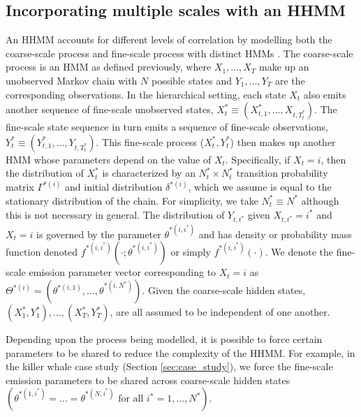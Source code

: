 \subsection{Incorporating multiple scales with an HHMM}

An HHMM accounts for different levels of correlation by modelling both the coarse-scale process and fine-scale process with distinct HMMs \citep{Barajas:2017,Adam:2019}. The coarse-scale process is an HMM as defined previously, where $X_1, \ldots, X_T$ make up an unobserved Markov chain with $N$ possible states and $Y_1,\ldots, Y_T$ are the corresponding observations.   
%
In the hierarchical setting, each state $X_t$ also emits another sequence of fine-scale unobserved states, $X_t^* \equiv (X_{t,1}^*,\ldots, X_{t,T_t^*})$. The fine-scale state sequence in turn emits a sequence of fine-scale observations, $Y_t^* \equiv (Y_{t,1}^*,\ldots, Y_{t,T_t^*})$. This fine-scale process ($X_t^*, Y_t^*$) then makes up another HMM whose parameters depend on the value of $X_t$. Specifically, if $X_t=i$, then the distribution of $X_t^*$ is characterized by an $N^*_t \times N^*_t$ transition probability matrix $\Gamma^{*(i)}$ and initial distribution $\delta^{*(i)}$, which we assume is equal to the stationary distribution of the chain. For simplicity, we take $N_t^* \equiv N^*$ although this is not necessary in general. The distribution of $Y_{t, t^*}$ given $X_{t, t^*}=i^*$ and $X_t=i$ is governed by the parameter $\theta^{*(i,i^*)}$ and has density or probability mass function denoted $f^{*(i,i^*)}\left(\cdot; \theta^{*(i,i^*)}\right)$ or simply $f^{*(i,i^*)}(\cdot)$. We denote the fine-scale emission parameter vector corresponding to $X_t=i$ as $\Theta^{*(i)}=\left(\theta^{*(i,1)}, \ldots, \theta^{*(i,N^*)}\right)$. Given the coarse-scale hidden states, $(X_1^*, Y_1^*), \ldots, (X_T^*, Y_T^*)$, are all assumed to be independent of one another.

Depending upon the process being modelled, it is possible to force certain parameters to be shared to reduce the complexity of the HHMM. For example, in the killer whale case study (Section \ref{sec:case_study}), we force the fine-scale emission parameters to be shared across coarse-scale hidden states $\left( \theta^{*(1,i^*)} = \ldots = \theta^{*(N,i^*)} \text{ for all } i^* = 1, \ldots, N^* \right)$. 

